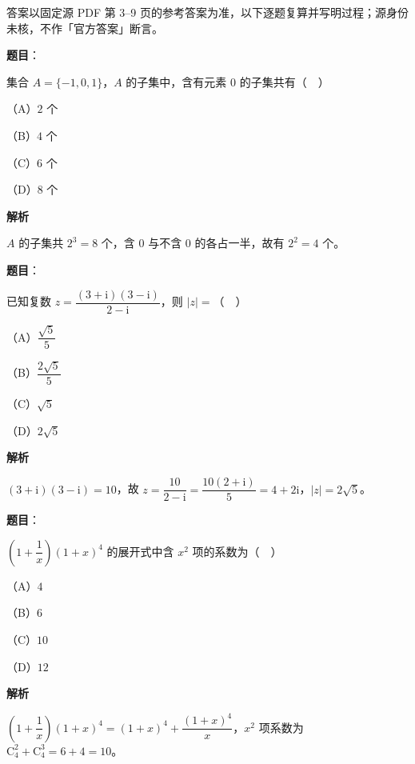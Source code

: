 

\begin{gktip}
答案以固定源 PDF 第 3–9 页的参考答案为准，以下逐题复算并写明过程；源身份未核，不作「官方答案」断言。
\end{gktip}

\begin{answer}

\textbf{题目}：

集合 $A=\{-1,0,1\}$，$A$ 的子集中，含有元素 $0$ 的子集共有（　）

（A）$2$ 个

（B）$4$ 个

（C）$6$ 个

（D）$8$ 个

\textbf{解析}

$A$ 的子集共 $2^3=8$ 个，含 $0$ 与不含 $0$ 的各占一半，故有 $2^2=4$ 个。


\end{answer}
\begin{answer}

\textbf{题目}：

已知复数 $z=\dfrac{(3+\mathrm i)(3-\mathrm i)}{2-\mathrm i}$，则 $|z|=$（　）

（A）$\dfrac{\sqrt5}5$

（B）$\dfrac{2\sqrt5}5$

（C）$\sqrt5$

（D）$2\sqrt5$

\textbf{解析}

$(3+\mathrm i)(3-\mathrm i)=10$，故 $z=\dfrac{10}{2-\mathrm i}=\dfrac{10(2+\mathrm i)}5=4+2\mathrm i$，$|z|=2\sqrt5$。


\end{answer}
\begin{answer}

\textbf{题目}：

$\left(1+\dfrac1x\right)(1+x)^4$ 的展开式中含 $x^2$ 项的系数为（　）

（A）$4$

（B）$6$

（C）$10$

（D）$12$

\textbf{解析}

$\left(1+\dfrac1x\right)(1+x)^4=(1+x)^4+\dfrac{(1+x)^4}x$，$x^2$ 项系数为 $\mathrm C_4^2+\mathrm C_4^3=6+4=10$。


\end{answer}
